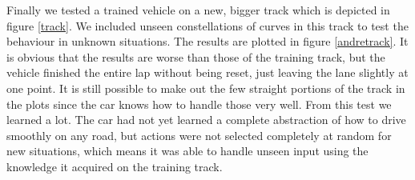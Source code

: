 Finally we tested a trained vehicle on a new, bigger track which is depicted in figure \ref{track}. We included unseen constellations of curves in this track to test the behaviour in unknown situations. The results are plotted in figure \ref{andretrack}. It is obvious that the results are worse than those of the training track, but the vehicle finished the entire lap without being reset, just leaving the lane slightly at one point. It is still possible to make out the few straight portions of the track in the plots since the car knows how to handle those very well. From this test we learned a lot. The car had not yet learned a complete abstraction of how to drive smoothly on any road, but actions were not selected completely at random for new situations, which means it was able to handle unseen input using the knowledge it acquired on the training track.